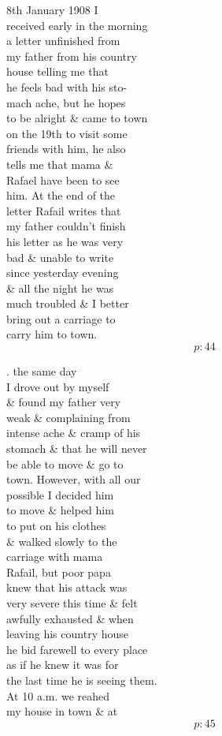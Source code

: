 \documentclass{report}
\begin{document}
	\par{
 	8th January 1908 I\ \\received early in the morning\ \\a letter unfinished from\ \\my father from his country\ \\house telling me that\ \\he feels bad with his sto-\ \\mach ache, but he hopes\ \\to be alright \& came to town\ \\on the 19th to visit some\ \\friends with him, he also\ \\tells me that mama \&\ \\Rafael have been to see\ \\him. At the end of the\ \\letter Rafail writes that\ \\my father couldn't finish\ \\his letter as he was very\ \\bad \& unable to write\ \\since yesterday evening\ \\\& all the night he was\ \\much troubled \& I better\ \\bring out a carriage to\ \\carry him to town.\ \\
  \[p: 44 \]

	}

	\par{
 	. the same day\ \\I drove out by myself\ \\\& found my father very\ \\weak \& complaining from\ \\intense ache \& cramp of his\ \\stomach \& that he will never\ \\be able to move \& go to\ \\town. However, with all our\ \\possible I decided him\ \\to move \& helped him\ \\to put on his clothes\ \\\& walked slowly to the\ \\carriage with mama\ \\Rafail, but poor papa\ \\knew that his attack was\ \\very severe this time \& felt\ \\awfully exhausted \& when\ \\leaving his country house\ \\he bid farewell to every place\ \\as if he knew it was for\ \\the last time he is seeing them.\ \\At 10 a.m. we reahed\ \\my house in town \& at\ \\
  \[p: 45 \]

	}
\end{document}
